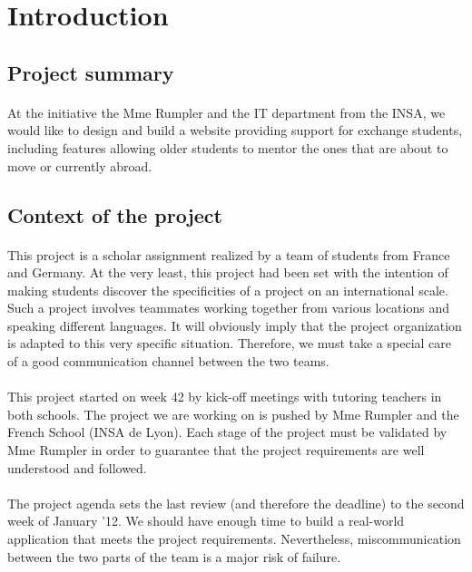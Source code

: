 \section{Introduction}

\subsection{Project summary}

\paragraph{} At the initiative the Mme Rumpler and the IT department from the
INSA, we would like to design and build a website providing support for exchange
students, including features allowing older students to mentor the ones that are
about to move or currently abroad.

\subsection{Context of the project}

\paragraph{} This project is a scholar assignment realized by a team of
students from France and Germany. At the very least, this project had been set
with the intention of making students discover the specificities of a project on
an international scale. Such a project involves teammates working together from
various locations and speaking different languages. It will obviously imply that
the project organization is adapted to this very specific situation.
Therefore, we must take a special care of a good communication channel between
the two teams.

\paragraph{} This project started on week 42 by kick-off meetings with tutoring
teachers in both schools. The project we are working on is pushed by Mme
Rumpler and the French School (INSA de Lyon). Each stage of the project must be
validated by Mme Rumpler in order to guarantee that the project requirements
are well understood and followed.

\paragraph{} The project agenda sets the last review (and therefore the
deadline) to the second week of January '12. We should have enough time to
build a real-world application that meets the project requirements.
Nevertheless, miscommunication between the two parts of the team is a major risk
of failure.
